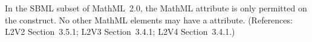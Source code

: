 In the SBML subset of MathML~2.0, the MathML attribute
 is only permitted on the  construct.
No other MathML elements may have a  attribute.
(References: L2V2 Section~3.5.1; L2V3 Section~3.4.1; L2V4 Section~3.4.1.)
